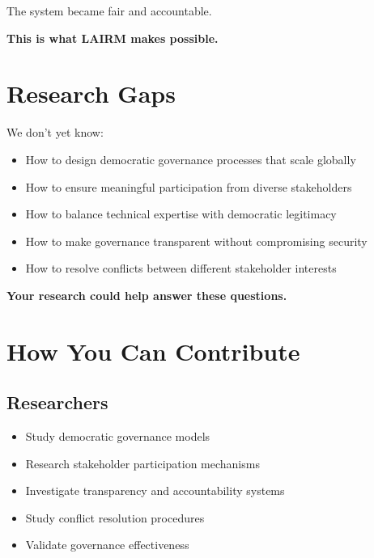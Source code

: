 The system became fair and accountable.

\textbf{This is what LAIRM makes possible.}

\vspace{0.5cm}

\section{Research Gaps}

We don't yet know:

\begin{itemize}
    \item How to design democratic governance processes that scale globally
    
    \item How to ensure meaningful participation from diverse stakeholders
    
    \item How to balance technical expertise with democratic legitimacy
    
    \item How to make governance transparent without compromising security
    
    \item How to resolve conflicts between different stakeholder interests
\end{itemize}

\textbf{Your research could help answer these questions.}

\vspace{0.5cm}

\section{How You Can Contribute}

\subsection{Researchers}

\begin{itemize}
    \item Study democratic governance models
    \item Research stakeholder participation mechanisms
    \item Investigate transparency and accountability systems
    \item Study conflict resolution procedures
    \item Validate governance effectiveness
\end{itemize}

